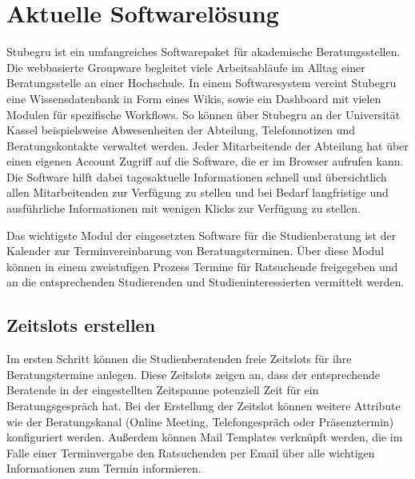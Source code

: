 \section{Aktuelle Softwarelösung}
Stubegru ist ein umfangreiches Softwarepaket für akademische Beratungsstellen.
Die webbasierte Groupware begleitet viele Arbeitsabläufe im Alltag einer
Beratungsstelle an einer Hochschule. In einem Softwaresystem vereint Stubegru
eine Wissensdatenbank in Form eines Wikis, sowie ein Dashboard mit vielen
Modulen für spezifische Workflows. So können über Stubegru an der Universität
Kassel beispielsweise Abwesenheiten der Abteilung, Telefonnotizen und
Beratungskontakte verwaltet werden. Jeder Mitarbeitende der Abteilung hat über
einen eigenen Account Zugriff auf die Software, die er im Browser aufrufen
kann. Die Software hilft dabei tagesaktuelle Informationen schnell und
übersichtlich allen Mitarbeitenden zur Verfügung zu stellen und bei Bedarf
langfristige und ausführliche Informationen mit wenigen Klicks zur Verfügung zu
stellen.\cite{stubegruWebsite}

Das wichtigste Modul der eingesetzten Software für die Studienberatung ist der
Kalender zur Terminvereinbarung von Beratungsterminen. Über diese Modul können
in einem zweistufigen Prozess Termine für Ratsuchende freigegeben und an die
entsprechenden Studierenden und Studieninteressierten vermittelt werden.

\subsection{Zeitslots erstellen}
Im ersten Schritt können die Studienberatenden freie Zeitslots für ihre
Beratungstermine anlegen. Diese Zeitslots zeigen an, dass der entsprechende
Beratende in der eingestellten Zeitspanne potenziell Zeit für ein
Beratungsgespräch hat. Bei der Erstellung der Zeitslot können weitere Attribute
wie der Beratungskanal (Online Meeting, Telefongespräch oder Präsenztermin)
konfiguriert werden. Außerdem können Mail Templates verknüpft werden, die im
Falle einer Terminvergabe den Ratsuchenden per Email über alle wichtigen
Informationen zum Termin informieren.

